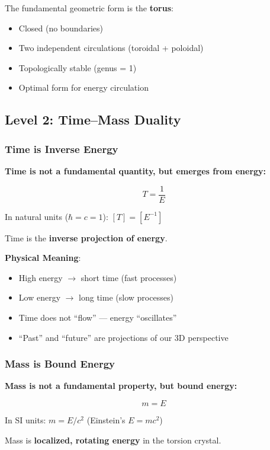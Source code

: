 	The fundamental geometric form is the \textbf{torus}:
	\begin{itemize}
		\item Closed (no boundaries)
		\item Two independent circulations (toroidal + poloidal)
		\item Topologically stable (genus = 1)
		\item Optimal form for energy circulation
	\end{itemize}

	\subsection{Level 2: Time–Mass Duality}

	\subsubsection{Time is Inverse Energy}

	\begin{keyresult}
		\textbf{Time is not a fundamental quantity, but emerges from energy:}

		\begin{equation}
			\boxed{T = \frac{1}{E}}
		\end{equation}

		In natural units ($\hbar = c = 1$): $[T] = [E^{-1}]$

		\vspace{0.3cm}

		Time is the \textbf{inverse projection of energy}.
	\end{keyresult}

	\textbf{Physical Meaning}:
	\begin{itemize}
		\item High energy $\to$ short time (fast processes)
		\item Low energy $\to$ long time (slow processes)
		\item Time does not \enquote{flow} — energy \enquote{oscillates}
		\item \enquote{Past} and \enquote{future} are projections of our 3D perspective
	\end{itemize}

	\subsubsection{Mass is Bound Energy}

	\begin{keyresult}
		\textbf{Mass is not a fundamental property, but bound energy:}

		\begin{equation}
			\boxed{m = E}
		\end{equation}

		In SI units: $m = E/c^2$ (Einstein’s $E = mc^2$)

		\vspace{0.3cm}

		Mass is \textbf{localized, rotating energy} in the torsion crystal.
	\end{keyresult}


